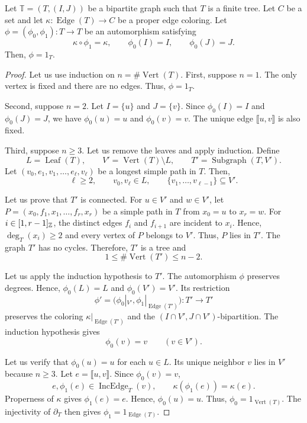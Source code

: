 \begin{lemma}\label{lem:colored-tree-rigidity}
Let $\mathbb T=(T,(I,J))$ be a bipartite graph such that $T$ is a finite tree.
Let $C$ be a set and let $\kappa:\operatorname{Edge}(T)\to C$ be a proper edge coloring.
Let $\phi=(\phi_0,\phi_1):T\to T$ be an automorphism satisfying
\[
 \kappa\circ\phi_1=\kappa,\qquad \phi_0(I)=I,\qquad \phi_0(J)=J.
\]
Then, $\phi=1_T$.
\end{lemma}
\begin{proof}
Let us use induction on $n=\#\operatorname{Vert}(T)$.
First, suppose $n=1$. The only vertex is fixed and there are no edges. Thus, $\phi=1_T$.

Second, suppose $n=2$. Let $I=\{u\}$ and $J=\{v\}$.
Since $\phi_0(I)=I$ and $\phi_0(J)=J$, we have $\phi_0(u)=u$ and $\phi_0(v)=v$.
The unique edge $\llbracket u,v\rrbracket$ is also fixed.

Third, suppose $n\ge3$. Let us remove the leaves and apply induction. Define
\[
 L=\operatorname{Leaf}(T),\qquad
 V'=\operatorname{Vert}(T)\setminus L,\qquad
 T'=\operatorname{Subgraph}(T,V').
\]
Let $(v_0,e_1,v_1,\ldots,e_\ell,v_\ell)$ be a longest simple path in $T$.
Then,
\[
 \ell\ge2,\qquad v_0,v_\ell\in L,\qquad
 \{v_1,\ldots,v_{\ell-1}\}\subseteq V'.
\]

Let us prove that $T'$ is connected.
For $u\in V'$ and $w\in V'$, let $P=(x_0,f_1,x_1,\ldots,f_r,x_r)$ be a simple path in $T$ from $x_0=u$ to $x_r=w$.
For $i\in[1,r-1]_{\mathbb Z}$, the distinct edges $f_i$ and $f_{i+1}$ are incident to $x_i$.
Hence, $\deg_T(x_i)\ge2$ and every vertex of $P$ belongs to $V'$.
Thus, $P$ lies in $T'$.
The graph $T'$ has no cycles. Therefore, $T'$ is a tree and
\[
 1\le\#\operatorname{Vert}(T')\le n-2.
\]

Let us apply the induction hypothesis to $T'$.
The automorphism $\phi$ preserves degrees. Hence, $\phi_0(L)=L$ and $\phi_0(V')=V'$.
Its restriction
\[
 \phi'=\bigl(\phi_0|_{V'},\phi_1|_{\operatorname{Edge}(T')}\bigr):T'\to T'
\]
preserves the coloring $\kappa|_{\operatorname{Edge}(T')}$ and the $(I\cap V',J\cap V')$-bipartition.
The induction hypothesis gives
\[
 \phi_0(v)=v\qquad(v\in V').
\]

Let us verify that $\phi_0(u)=u$ for each $u\in L$.
Its unique neighbor $v$ lies in $V'$ because $n\ge3$.
Let $e=\llbracket u,v\rrbracket$. Since $\phi_0(v)=v$,
\[
 e,\phi_1(e)\in\operatorname{IncEdge}_T(v),\qquad
 \kappa(\phi_1(e))=\kappa(e).
\]
Properness of $\kappa$ gives $\phi_1(e)=e$. Hence, $\phi_0(u)=u$.
Thus, $\phi_0=1_{\operatorname{Vert}(T)}$.
The injectivity of $\partial_T$ then gives $\phi_1=1_{\operatorname{Edge}(T)}$.
\end{proof}

